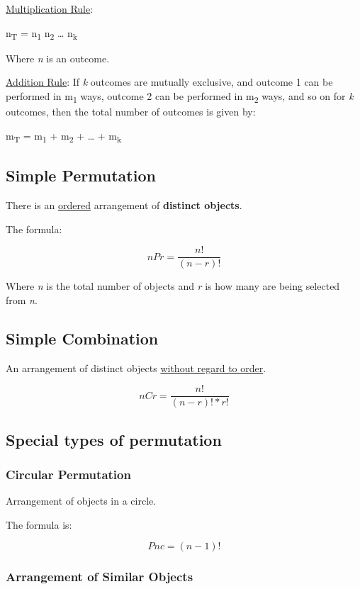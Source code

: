 \documentclass[11pt]{article}
\begin{document}
\uline{Multiplication Rule}:

n\textsubscript{T} = n\textsubscript{1} \texttimes{} n\textsubscript{2} \texttimes{} \ldots{} \texttimes{} n\textsubscript{k}

Where \emph{n} is an outcome.

\uline{Addition Rule}:
If \emph{k} outcomes are mutually exclusive, and outcome 1 can be performed in m\textsubscript{1} ways, outcome 2 can be performed in m\textsubscript{2} ways, and so on for \emph{k} outcomes, then the total number of outcomes is given by:

m\textsubscript{T} = m\textsubscript{1} + m\textsubscript{2} + \ldots{} + m\textsubscript{k}
\subsection{Simple Permutation}
\label{sec:orga6a37f7}

There is an \uline{ordered} arrangement of \textbf{distinct objects}.

The formula:

\[
nPr = \frac{n!}{(n-r)!}
\]

Where \emph{n} is the total number of objects and \emph{r} is how many are being selected from \emph{n}.
\subsection{Simple Combination}
\label{sec:org319097d}

An arrangement of distinct objects \uline{without regard to order}.

\[
nCr = \frac{n!}{(n-r)! * r!}
\]
\subsection{Special types of permutation}
\label{sec:org1f6e5a7}

\subsubsection{Circular Permutation}
\label{sec:orga20f324}

Arrangement of objects in a circle.

The formula is:

\[
Pnc = (n-1)!
\]
\subsubsection{Arrangement of Similar Objects}
\label{sec:orge8ccc9a}
\end{document}
